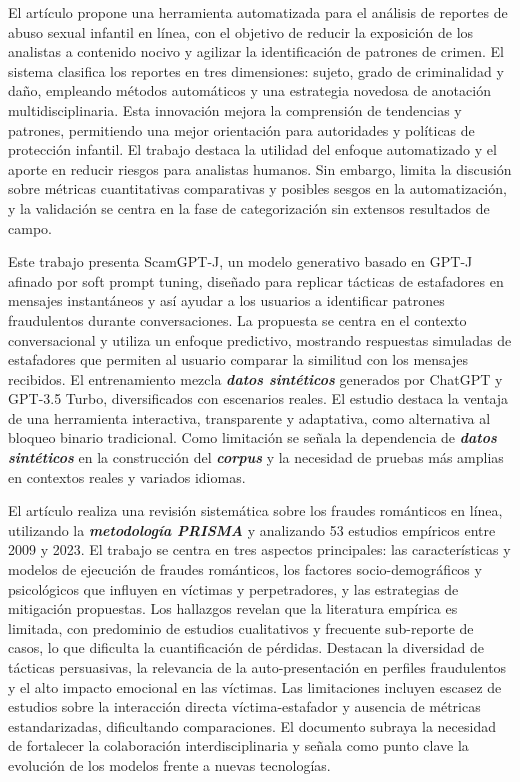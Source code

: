 \cite{Hossain2025}

El artículo propone una herramienta automatizada para el análisis de reportes de abuso sexual infantil en línea, con el objetivo de reducir la exposición de los analistas a contenido nocivo y agilizar la identificación de patrones de crimen. El sistema clasifica los reportes en tres dimensiones: sujeto, grado de criminalidad y daño, empleando métodos automáticos y una estrategia novedosa de anotación multidisciplinaria. Esta innovación mejora la comprensión de tendencias y patrones, permitiendo una mejor orientación para autoridades y políticas de protección infantil. El trabajo destaca la utilidad del enfoque automatizado y el aporte en reducir riesgos para analistas humanos. Sin embargo, limita la discusión sobre métricas cuantitativas comparativas y posibles sesgos en la automatización, y la validación se centra en la fase de categorización sin extensos resultados de campo.

\cite{Puentes2023}

Este trabajo presenta ScamGPT-J, un modelo generativo basado en GPT-J afinado por soft prompt tuning, diseñado para replicar tácticas de estafadores en mensajes instantáneos y así ayudar a los usuarios a identificar patrones fraudulentos durante conversaciones. La propuesta se centra en el contexto conversacional y utiliza un enfoque predictivo, mostrando respuestas simuladas de estafadores que permiten al usuario comparar la similitud con los mensajes recibidos. El entrenamiento mezcla \textbf{\textit{datos sintéticos}} generados por ChatGPT y GPT-3.5 Turbo, diversificados con escenarios reales. El estudio destaca la ventaja de una herramienta interactiva, transparente y adaptativa, como alternativa al bloqueo binario tradicional. Como limitación se señala la dependencia de \textbf{\textit{datos sintéticos}} en la construcción del \textbf{\textit{corpus}} y la necesidad de pruebas más amplias en contextos reales y variados idiomas.

\cite{Tan2024}

El artículo realiza una revisión sistemática sobre los fraudes románticos en línea, utilizando la \textbf{\textit{metodología PRISMA}} y analizando 53 estudios empíricos entre 2009 y 2023. El trabajo se centra en tres aspectos principales: las características y modelos de ejecución de fraudes románticos, los factores socio-demográficos y psicológicos que influyen en víctimas y perpetradores, y las estrategias de mitigación propuestas. Los hallazgos revelan que la literatura empírica es limitada, con predominio de estudios cualitativos y frecuente sub-reporte de casos, lo que dificulta la cuantificación de pérdidas. Destacan la diversidad de tácticas persuasivas, la relevancia de la auto-presentación en perfiles fraudulentos y el alto impacto emocional en las víctimas. Las limitaciones incluyen escasez de estudios sobre la interacción directa víctima-estafador y ausencia de métricas estandarizadas, dificultando comparaciones. El documento subraya la necesidad de fortalecer la colaboración interdisciplinaria y señala como punto clave la evolución de los modelos frente a nuevas tecnologías.

